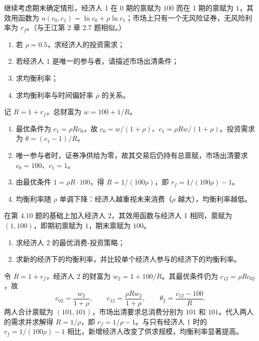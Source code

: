 \begin{problem}
 继续考虑期末确定情形，经济人 1 在 0 期的禀赋为 $100$ 而在 1 期的禀赋为 $1$，其效用函数为 $u(c_0,c_1)=\ln c_0+\rho\ln c_1$；市场上只有一个无风险证券，无风险利率为 $r_f$。（与王江第 2 章 2.7 题相似。）
\begin{enumerate}[label=(\alph*)]
    \item 若 $\rho=0.5$，求经济人的投资需求；
    \item 若经济人 1 是唯一的参与者，请描述市场出清条件；
    \item 求均衡利率；
    \item 求均衡利率与时间偏好率 $\rho$ 的关系。
\end{enumerate}
\end{problem}
\begin{solution}
记 $R=1+r_f$，总财富为 $w=100+1/R$。
\begin{enumerate}[label=(\alph*)]
\item 最优条件为 $c_1=\rho R c_0$，故 $c_0=w/(1+\rho)$、$c_1=\rho Rw/(1+\rho)$。投资需求为 $\theta=(c_1-1)/R$。
\item 唯一参与者时，证券净供给为零，故其交易后仍持有总禀赋，市场出清要求 $c_0=100$、$c_1=1$。
\item 由最优条件 $1=\rho R\cdot100$，得 $R=1/(100\rho)$，即 $r_f=1/(100\rho)-1$。
\item 均衡利率随 $\rho$ 单调下降：经济人越重视未来消费（$\rho$ 越大），均衡利率越低。
\end{enumerate}
\end{solution}
\begin{problem}
 在第 4.10 题的基础上加入经济人 2，其效用函数与经济人 1 相同，禀赋为 $(1,100)$，即期初禀赋为 $1$，期末禀赋为 $100$。
\begin{enumerate}[label=(\alph*)]
    \item 求经济人 2 的最优消费-投资策略；
    \item 求新的经济下的均衡利率，并比较单个经济人参与的经济下的均衡利率。
\end{enumerate}
\end{problem}
\begin{solution}
令 $R=1+r_f$，经济人 2 的财富为 $w_2=1+100/R$。其最优条件仍为 $c_{12}=\rho R c_{02}$，故
\[
c_{02}=\frac{w_2}{1+\rho},\qquad c_{12}=\frac{\rho Rw_2}{1+\rho},\qquad \theta_2=\frac{c_{12}-100}{R}.
\]
两人合计禀赋为 $(101,101)$，市场出清要求总消费分别为 $101$ 和 $101$。代入两人的需求并求解得 $R=1/\rho$，即 $r_f=1/\rho-1$。与只有经济人 1 时的 $r_f=1/(100\rho)-1$ 相比，新增经济人改变了供求规模，均衡利率显著提高。
\end{solution}
